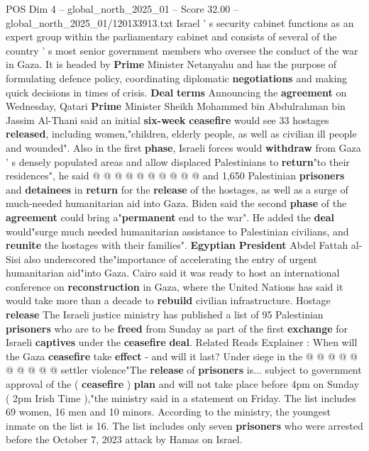 \begin{textsample}{POS Dim 4 – global\_north\_2025\_01 – Score 32.00 – global\_north\_2025\_01/120133913.txt}
Israel ' s security cabinet functions as an expert group within the parliamentary cabinet and consists of several of the country ' s most senior government members who oversee the conduct of the war in Gaza.
It is headed by \textbf{Prime} Minister Netanyahu and has the purpose of formulating defence policy, coordinating diplomatic \textbf{negotiations} and making quick decisions in times of crisis. \textbf{Deal} \textbf{terms} Announcing the \textbf{agreement} on Wednesday, Qatari \textbf{Prime} Minister Sheikh Mohammed bin Abdulrahman bin Jassim Al-Thani said an initial \textbf{six-week} \textbf{ceasefire} would see 33 hostages \textbf{released}, including women,"children, elderly people, as well as civilian ill people and wounded".
Also in the first \textbf{phase}, Israeli forces would \textbf{withdraw} from Gaza ' s densely populated areas and allow displaced Palestinians to \textbf{return}"to their residences", he said @ @ @ @ @ @ @ @ @ @ and 1,650 Palestinian \textbf{prisoners} and \textbf{detainees} in \textbf{return} for the \textbf{release} of the hostages, as well as a surge of much-needed humanitarian aid into Gaza.
Biden said the second \textbf{phase} of the \textbf{agreement} could bring a"\textbf{permanent} end to the war".
He added the \textbf{deal} would"surge much needed humanitarian assistance to Palestinian civilians, and \textbf{reunite} the hostages with their families". \textbf{Egyptian} \textbf{President} Abdel Fattah al-Sisi also underscored the"importance of accelerating the entry of urgent humanitarian aid"into Gaza.
Cairo said it was ready to host an international conference on \textbf{reconstruction} in Gaza, where the United Nations has said it would take more than a decade to \textbf{rebuild} civilian infrastructure.
Hostage \textbf{release} The Israeli justice ministry has published a list of 95 Palestinian \textbf{prisoners} who are to be \textbf{freed} from Sunday as part of the first \textbf{exchange} for Israeli \textbf{captives} under the \textbf{ceasefire} \textbf{deal}.
Related Reads Explainer : When will the Gaza \textbf{ceasefire} take \textbf{effect} - and will it last?
Under siege in the @ @ @ @ @ @ @ @ @ @ settler violence"The \textbf{release} of \textbf{prisoners} is... subject to government approval of the ( \textbf{ceasefire} ) \textbf{plan} and will not take place before 4pm on Sunday ( 2pm Irish Time ),"the ministry said in a statement on Friday.
The list includes 69 women, 16 men and 10 minors.
According to the ministry, the youngest inmate on the list is 16.
The list includes only seven \textbf{prisoners} who were arrested before the October 7, 2023 attack by Hamas on Israel.

\end{textsample}

